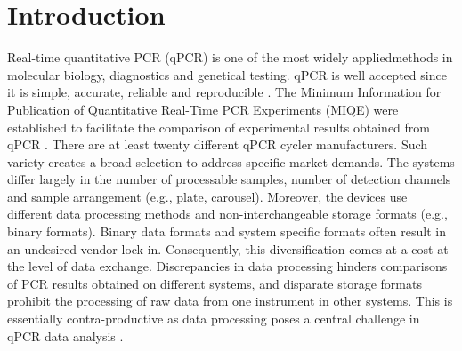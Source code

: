 \documentclass{bioinfo}
\begin{document}
\section{Introduction}
Real-time quantitative PCR (qPCR) is one of the most  widely appliedmethods in molecular 
biology, diagnostics and  genetical testing. qPCR is well accepted since 
it is simple, accurate, reliable and reproducible \cite{pabinger_2014}. The 
Minimum Information for Publication of Quantitative Real-Time PCR Experiments (MIQE) were established to facilitate the comparison of experimental results obtained from qPCR 
\cite{huggett_2013}. There are at least twenty different qPCR cycler manufacturers. Such variety creates a broad selection to 
address specific market demands. The systems differ largely in  the 
number of processable samples, number of detection channels and sample 
arrangement (e.g., plate, carousel). Moreover, the devices use different 
data processing methods and non-interchangeable storage formats (e.g., binary formats). 
Binary data formats and system specific formats often result in  an undesired vendor 
lock-in. Consequently, this diversification comes at a cost at the level of data 
exchange. Discrepancies in data processing hinders  comparisons of PCR results 
obtained on different systems, and disparate storage formats prohibit the processing 
of raw data from one instrument in other systems. This is essentially contra-productive as data processing  poses a 
central challenge in qPCR data analysis \cite{bustin_reproducibility_2014, roediger2015r, 
spiess_impact_2014, spiess_system-specific_2016}.
\end{document}
